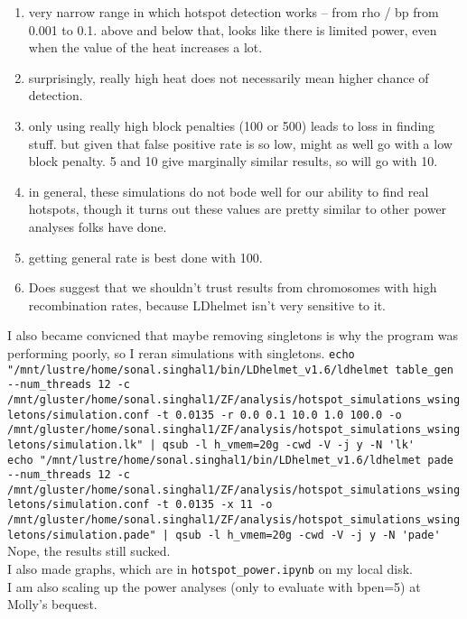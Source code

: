 \documentclass[idxtotoc,hyperref,openany,oneside]{labbook} %
\begin{document}
\begin{itemize}
\begin{enumerate}
\item very narrow range in which hotspot detection works -- from rho / bp from 0.001 to 0.1. above and below that, looks like there is limited power, even when the value of the heat increases a lot.
\item surprisingly, really high heat does not necessarily mean higher chance of detection.
\item only using really high block penalties (100 or 500) leads to loss in finding stuff. but given that false positive rate is so low, might as well go with a low block penalty. 5 and 10 give marginally similar results, so will go with 10.
\item in general, these simulations do not bode well for our ability to find real hotspots, though it turns out these values are pretty similar to other power analyses folks have done.
\item getting general rate is best done with 100.
\item Does suggest that we shouldn't trust results from chromosomes with high recombination rates, because LDhelmet isn't very sensitive to it.
\end{enumerate}
I also became convicned that maybe removing singletons is why the program was performing poorly, so I reran simulations with singletons.
\verb+echo "/mnt/lustre/home/sonal.singhal1/bin/LDhelmet_v1.6/ldhelmet table_gen --num_threads 12 -c /mnt/gluster/home/sonal.singhal1/ZF/analysis/hotspot_simulations_wsingletons/simulation.conf -t 0.0135 -r 0.0 0.1 10.0 1.0 100.0 -o /mnt/gluster/home/sonal.singhal1/ZF/analysis/hotspot_simulations_wsingletons/simulation.lk" | qsub -l h_vmem=20g -cwd -V -j y -N 'lk'+ \\
\verb+echo "/mnt/lustre/home/sonal.singhal1/bin/LDhelmet_v1.6/ldhelmet pade --num_threads 12 -c /mnt/gluster/home/sonal.singhal1/ZF/analysis/hotspot_simulations_wsingletons/simulation.conf -t 0.0135 -x 11 -o /mnt/gluster/home/sonal.singhal1/ZF/analysis/hotspot_simulations_wsingletons/simulation.pade" | qsub -l h_vmem=20g -cwd -V -j y -N 'pade'+ \\
Nope, the results still sucked. \\

I also made graphs, which are in \verb+hotspot_power.ipynb+ on my local disk. \\

I am also scaling up the power analyses (only to evaluate with bpen=5) at Molly's bequest.


\end{itemize}
\end{document}
